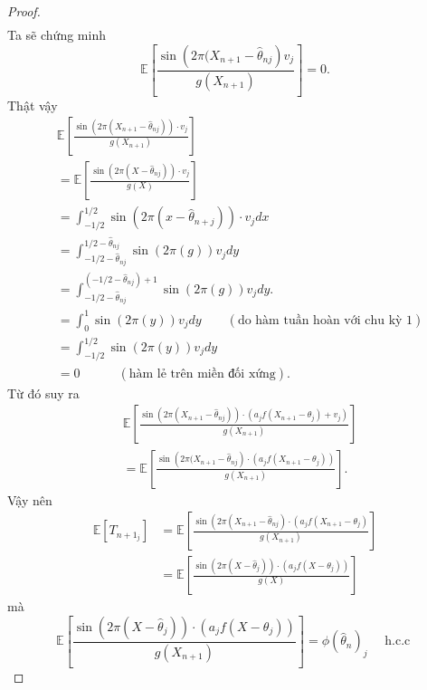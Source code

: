 \begin{proof}
$$\begin{aligned}
\end{aligned}
$$
Ta sẽ chứng minh 
$$
\mathbb{E}\left[\frac{\sin \left(2 \pi ( X_ { n + 1 } - \hat { \theta } _ { n j } \right)v_j}{g\left(X_{n+1}\right)}\right] = 0.
$$
Thật vậy
$$
\begin{aligned}
&\mathbb{E}\left[\frac{\sin \left(2 \pi\left(X_{n+1}-\hat{\theta}_{n j}\right)\right)\cdot v_j}{g\left(X_{n+1}\right)} \right] \\
&=\mathbb{E}\left[\frac{\sin \left(2 \pi\left(X-\hat{\theta}_{n j}\right)\right) \cdot v_j}{g(X)}\right] \\
&=\int_{-1 / 2}^{1 / 2} \sin \left(2 \pi\left(x-\hat{\theta}_{n+j}\right)\right) \cdot v_j d x \\
&= \int_{-1 / 2 - \hat{\theta}_{n j}}^{1 / 2 - \hat{\theta}_{n j}} \sin (2 \pi(g)) v_j d y \\
&= \int_{-1 / 2 - \hat{\theta}_{n j}}^{\left(-1 / 2 - \hat{\theta}_{n j}\right) + 1} \sin (2 \pi(g)) v_j d y . \\
&=\int_0^1 \sin (2 \pi(y)) v_j d y \quad \quad \left(\text{do hàm tuần hoàn với chu kỳ 1}\right)\\
&=\int_{-1 / 2}^{1 / 2} \sin (2 \pi(y)) v_j d y \\
&= 0 \quad \quad \quad \left(\text{hàm lẻ trên miền đối xứng}\right).
\end{aligned}
$$
Từ đó suy ra
$$
\begin{aligned}
    &\mathbb{E}\left[\frac{\sin \left(2 \pi\left(X_{n+1}-\hat{\theta}_{n j}\right)\right) \cdot\left(a_j f\left(X_{n+1}-\theta_j\right)+v_j \right)}{g\left(X_{n+1}\right)}\right] \\
    &=\mathbb{E}\left[\frac{\sin \left(2 \pi ( X_ { n + 1 } - \hat { \theta } _ { n j } \right) \cdot \left(a_jf\left(X_{n+1}-\theta_j\right)\right)}{g\left(X_{n+1}\right)}\right].
\end{aligned}
$$
Vậy nên
    $$
    \begin{aligned}
        \mathbb{E}\left[T_{n+1_j}\right]
        &=\mathbb{E}\left[\frac{\sin \left(2 \pi ( X_ { n + 1 } - \hat { \theta } _ { n j } ) \cdot \left(a_jf\left(X_{n+1}-\theta_j\right)\right.\right.}{g\left(X_{n+1}\right)}\right] \\
        &=\mathbb{E}\left[\frac{\sin \left(2 \pi\left(X-\hat{\theta}_j\right)\right) \cdot\left(a_j f\left(X-\theta_j\right)\right)}{g\left(X\right)}\right]
    \end{aligned}
$$
mà 
$$
\mathbb{E}\left[\frac{\sin \left(2 \pi\left(X-\hat{\theta}_j\right)\right) \cdot\left(a_j f\left(X-\theta_j\right)\right)}{g\left(X_{n+1}\right)}\right] = \phi\left(\widehat{\theta}_{n}\right)_j \quad \text { h.c.c }
$$
\end{proof}
